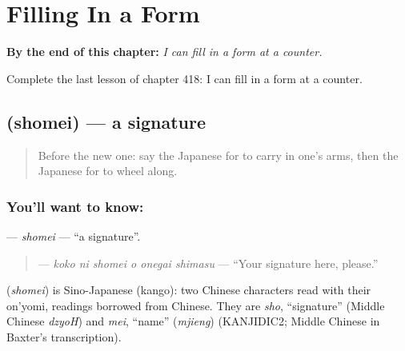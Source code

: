 
\chapter{Filling In a Form}
\label{ch:ja-filling-in-a-form}

\begin{chapteropening}
\textbf{By the end of this chapter:} \emph{I can fill in a form at a counter.}

Complete the last lesson of chapter 418: I can fill in a form at a counter.
\end{chapteropening}

\section[\texorpdfstring{\ja{しょめい} (shomei)}{しょめい (shomei)}]{ (shomei) — a signature}

\label{lesson:JA-C418-shomei}



\begin{quote}
Before the new one: say the Japanese for to carry in one's arms, then the Japanese for to wheel along.
\end{quote}

\subsection*{You'll want to know: }
\textbf{} — \emph{shomei} — \textquotedblleft{}a signature\textquotedblright{}.

\begin{quote}
\textbf{  } — \emph{koko ni shomei o onegai shimasu} — \textquotedblleft{}Your signature here, please.\textquotedblright{}
\end{quote}

\begin{cousinweb}
\textbf{} (\emph{shomei}) is Sino-Japanese (kango): two Chinese characters read with their on'yomi, readings borrowed from Chinese. They are \emph{sho}, \textquotedblleft{}signature\textquotedblright{} (Middle Chinese \emph{dzyoH}) and \emph{mei}, \textquotedblleft{}name\textquotedblright{} (\emph{mjieng}) (KANJIDIC2; Middle Chinese in Baxter's transcription).
\end{cousinweb}

